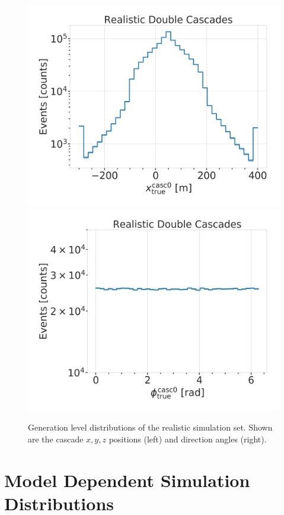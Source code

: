 \begin{figure}
    \centering
    \includegraphics[width=0.49\linewidth]{figures/model_independent_simulation/gen_level/194603_gen_level_1_d_distr_casc0_true_x_clipped.png}
    \includegraphics[width=0.49\linewidth]{figures/model_independent_simulation/gen_level/194603_gen_level_1_d_distr_casc0_true_azimuth_clipped.png}
    \caption[Realistic model independent simulation generation level distributions]{Generation level distributions of the realistic simulation set. Shown are the cascade $x, y, z$ positions (left) and direction angles (right).}
\end{figure}



\section{Model Dependent Simulation Distributions} 

